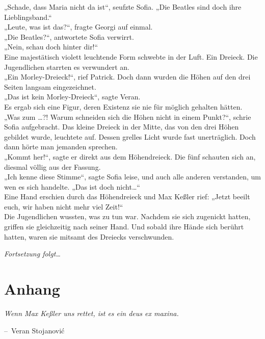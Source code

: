 \documentclass[oneside]{memoir}
\makeatletter
\newenvironment{chapquote}[2][2em]
  {\setlength{\@tempdima}{#1}%
   \def\chapquote@author{#2}%
   \parshape 1 \@tempdima \dimexpr\textwidth-2\@tempdima\relax%
   \itshape}
  {\par\normalfont\hfill--\ \chapquote@author\hspace*{\@tempdima}\par\bigskip}
\makeatother
\begin{document}
\noindent „Schade, dass Maria nicht da ist“, seufzte Sofia. „Die Beatles sind doch ihre Lieblingsband.“ \\
„Leute, was ist das?“, fragte Georgi auf einmal. \\
„Die Beatles?“, antwortete Sofia verwirrt. \\
„Nein, schau doch hinter dir!“ \\
Eine majestätisch violett leuchtende Form schwebte in der Luft. Ein Dreieck. Die Jugendlichen starrten es verwundert an. \\
„Ein Morley-Dreieck!“, rief Patrick. Doch dann wurden die Höhen auf den drei Seiten langsam eingezeichnet. \\
„Das ist kein Morley-Dreieck“, sagte Veran. \\
Es ergab sich eine Figur, deren Existenz sie nie für möglich gehalten hätten. \\
„Was zum \ldots?! Warum schneiden sich die Höhen nicht in einem Punkt?“, schrie Sofia aufgebracht. Das kleine Dreieck in der Mitte, das von den drei Höhen gebildet wurde, leuchtete auf. Dessen grelles Licht wurde fast unerträglich. Doch dann hörte man jemanden sprechen.  \\
„Kommt her!“, sagte er direkt aus dem Höhendreieck. Die fünf schauten sich an, diesmal völlig aus der Fassung. \\
„Ich kenne diese Stimme“, sagte Sofia leise, und auch alle anderen verstanden, um wen es sich handelte. „Das ist doch nicht\ldots“ \\
Eine Hand erschien durch das Höhendreieck und Max Keßler rief: „Jetzt beeilt euch, wir haben nicht mehr viel Zeit!“ \\
Die Jugendlichen wussten, was zu tun war. Nachdem sie sich zugenickt hatten, griffen sie gleichzeitig nach seiner Hand. Und sobald ihre Hände sich berührt hatten, waren sie mitsamt des Dreiecks verschwunden.

\newpage
\thispagestyle{empty}
\begin{center}
\textit{Fortsetzung folgt\ldots}
\end{center}

\chapter{Anhang}
\begin{chapquote}{Veran Stojanović}
\glqq Wenn Max Keßler uns rettet, ist es ein deus ex maxina.\grqq
\end{chapquote}
\end{document}

